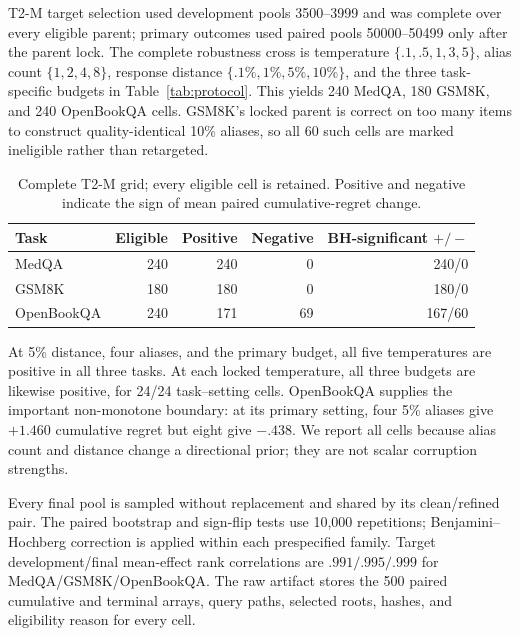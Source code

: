 T2-M target selection used development pools 3500--3999 and was complete over every eligible parent; primary outcomes used paired pools 50000--50499 only after the parent lock. The complete robustness cross is temperature $\{.1,.5,1,3,5\}$, alias count $\{1,2,4,8\}$, response distance $\{.1\%,1\%,5\%,10\%\}$, and the three task-specific budgets in Table~\ref{tab:protocol}. This yields 240 MedQA, 180 GSM8K, and 240 OpenBookQA cells. GSM8K's locked parent is correct on too many items to construct quality-identical 10\% aliases, so all 60 such cells are marked ineligible rather than retargeted.

\begin{table}[H]
\centering
\caption{Complete T2-M grid; every eligible cell is retained. Positive and negative indicate the sign of mean paired cumulative-regret change.}
\label{tab:complete-grid}
\small
\begin{tabular}{@{}lrrrr@{}}
\toprule
Task & Eligible & Positive & Negative & BH-significant $+/-$ \\
\midrule
MedQA & 240 & 240 & 0 & 240/0 \\
GSM8K & 180 & 180 & 0 & 180/0 \\
OpenBookQA & 240 & 171 & 69 & 167/60 \\
\bottomrule
\end{tabular}
\end{table}

At 5\% distance, four aliases, and the primary budget, all five temperatures are positive in all three tasks. At each locked temperature, all three budgets are likewise positive, for 24/24 task--setting cells. OpenBookQA supplies the important non-monotone boundary: at its primary setting, four 5\% aliases give $+1.460$ cumulative regret but eight give $-.438$. We report all cells because alias count and distance change a directional prior; they are not scalar corruption strengths.

Every final pool is sampled without replacement and shared by its clean/refined pair. The paired bootstrap and sign-flip tests use 10,000 repetitions; Benjamini--Hochberg correction is applied within each prespecified family. Target development/final mean-effect rank correlations are $.991/.995/.999$ for MedQA/GSM8K/OpenBookQA. The raw artifact stores the 500 paired cumulative and terminal arrays, query paths, selected roots, hashes, and eligibility reason for every cell.

